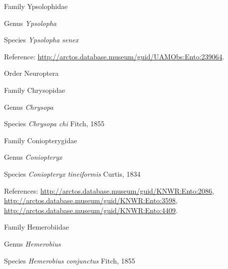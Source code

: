 \documentclass[9pt, article]{memoir}
\begin{document}
\begin{multicols}{2}
\vspace{6pt}\noindent\hspace{24pt}Family Ypsolophidae


\vspace{6pt}\noindent\hspace{30pt}Genus \textit{Ypsolopha}


\vspace{6pt}\noindent\hspace{36pt}Species \textit{Ypsolopha senex}


Reference: 
\url{http://arctos.database.museum/guid/UAMObs:Ento:239064}.

\vspace{6pt}\noindent\hspace{18pt}Order Neuroptera


\vspace{6pt}\noindent\hspace{24pt}Family Chrysopidae


\vspace{6pt}\noindent\hspace{30pt}Genus \textit{Chrysopa}


\vspace{6pt}\noindent\hspace{36pt}Species \textit{Chrysopa chi} Fitch, 1855


\vspace{6pt}\noindent\hspace{24pt}Family Coniopterygidae


\vspace{6pt}\noindent\hspace{30pt}Genus \textit{Coniopteryx}


\vspace{6pt}\noindent\hspace{36pt}Species \textit{Coniopteryx tineiformis} Curtis, 1834


References: 
\url{http://arctos.database.museum/guid/KNWR:Ento:2086}, 
\url{http://arctos.database.museum/guid/KNWR:Ento:3598}, 
\url{http://arctos.database.museum/guid/KNWR:Ento:4409}.

\vspace{6pt}\noindent\hspace{24pt}Family Hemerobiidae


\vspace{6pt}\noindent\hspace{30pt}Genus \textit{Hemerobius}


\vspace{6pt}\noindent\hspace{36pt}Species \textit{Hemerobius conjunctus} Fitch, 1855



\end{multicols}
\end{document}
